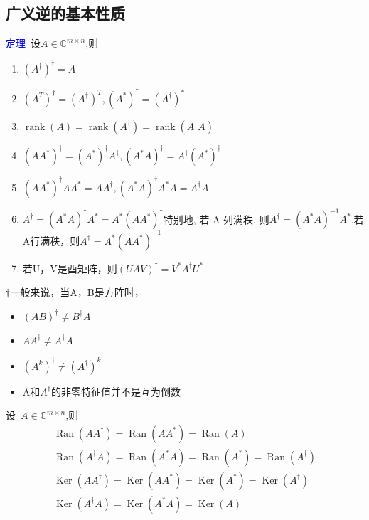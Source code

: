 \documentclass[12pt,a4paper]{article}
\begin{document}
\subsection{广义逆的基本性质}
\noindent \textcolor{blue}{定理}~设$A \in \mathbb{C}^{m \times n}$,则\begin{enumerate}[(1)]
	\item $(A^{\dagger})^{\dagger}=A$
	\item $(A^{T})^{\dagger}=(A^{\dagger})^{T},(A^{*})^{\dagger}=(A^{\dagger})^{*}$
	\item $\operatorname{rank}(A)=\operatorname{rank}\left(A^{\dagger}\right)=\operatorname{rank}\left(A^{\dagger} A\right)$
	\item $\left(A A^{*}\right)^{\dagger}=\left(A^{*}\right)^{\dagger} A^{\dagger},\left(A^{*} A\right)^{\dagger}=A^{\dagger}\left(A^{*}\right)^{\dagger}$
	\item $\left(A A^{*}\right)^{\dagger} A A^{*}=A A^{\dagger},\left(A^{*} A\right)^{\dagger} A^{*} A=A^{\dagger} A$
	\item $A^{\dagger}=\left(A^{*} A\right)^{\dagger} A^{*}=A^{*}\left(A A^{*}\right)^{\dagger}$特别地, 若 A 列满秩, 则$A^{\dagger}=\left(A^{*} A\right)^{-1} A^{*}$.若A行满秩，则$A^{\dagger}=A^{*}\left(A A^{*}\right)^{-1}$
	\item 若U，V是酉矩阵，则$(U A V)^{\dagger}=V^{*} A^{\dagger} U^{*}$
\end{enumerate}
$\dagger$一般来说，当A，B是方阵时，
\begin{itemize}
	\item $(A B)^{\dagger} \neq B^{\dagger} A^{\dagger}$
	\item $A A^{\dagger} \neq A^{\dagger} A$
	\item $\left(A^{k}\right)^{\dagger} \neq\left(A^{\dagger}\right)^{k}$
	\item A和$A^{\dagger}$的非零特征值并不是互为倒数
\end{itemize}
设~$A \in \mathbb{C}^{m \times n}$,则
$$
\begin{array}{l}{\operatorname{Ran}\left(A A^{\dagger}\right)=\operatorname{Ran}\left(A A^{*}\right)=\operatorname{Ran}(A)} \\ {\operatorname{Ran}\left(A^{\dagger} A\right)=\operatorname{Ran}\left(A^{*} A\right)=\operatorname{Ran}\left(A^{*}\right)=\operatorname{Ran}\left(A^{\dagger}\right)} \\ {\operatorname{Ker}\left(A A^{\dagger}\right)=\operatorname{Ker}\left(A A^{*}\right)=\operatorname{Ker}\left(A^{*}\right)=\operatorname{Ker}\left(A^{\dagger}\right)} \\ {\operatorname{Ker}\left(A^{\dagger} A\right)=\operatorname{Ker}\left(A^{*} A\right)=\operatorname{Ker}(A)}\end{array}
$$
\end{document}
